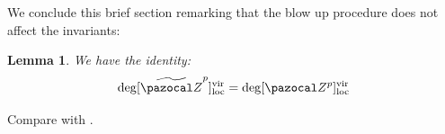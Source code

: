 \documentclass[11pt]{amsart}
\newcommand{\PP}{\mathbb P}
\renewcommand{\to}{\rightarrow}
\newcommand{\X}{\pazocal X}
\newcommand{\XP}{\pazocal{X\!P}}
\newcommand{\hL}{\widehat{\mathcal L}}
\newcommand{\cC}{\mathcal C}
\newcommand{\Z}{\pazocal Z}
\newcommand{\Zp}{\pazocal Z^p}
\newcommand{\tZp}{\widetilde{\pazocal Z}^p}
\newcommand{\MM}{\mathfrak M}
\newcommand{\oM}{\overline{\pazocal M}}
\newcommand{\virloc}[1]{[#1]^{\rm{vir}}_{\rm{loc}}}
\newcommand{\bcd}{\begin{center}\begin{tikzcd}}
\newcommand{\ecd}{\end{tikzcd}\end{center}}
\newcommand{\Pic}{\operatorname{Pic}}
\theoremstyle{plain}
\newtheorem{lem}[thm]{Lemma}
\theoremstyle{definition}
\begin{document}

We conclude this brief section remarking that the blow up procedure does not affect the invariants:
\begin{lem}
We have the identity:
\[\deg\virloc{\tZp}=\deg\virloc{\Zp}\]
\end{lem}
Compare with \cite[Proposition~2.5]{CL}.
\end{document}
